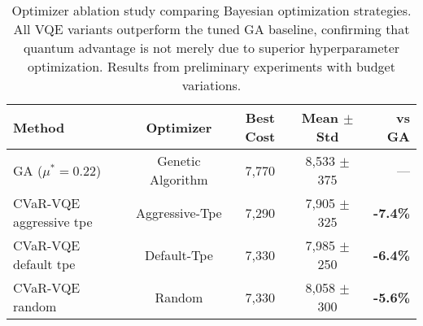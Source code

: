 \begin{table}[htb]
    \centering
    \caption{Optimizer ablation study comparing Bayesian optimization strategies. All VQE variants outperform the tuned GA baseline, confirming that quantum advantage is not merely due to superior hyperparameter optimization. Results from preliminary experiments with budget variations.}
    \label{tab:optimizer_ablation}
    \begin{tabular}{lcccr}
        \toprule
        Method & Optimizer & Best Cost & Mean $\pm$ Std & vs GA \\
        \midrule
        GA ($\mu^* = 0.22$) & Genetic Algorithm & 7,770 & 8,533 $\pm$ 375 & — \\
        CVaR-VQE aggressive tpe & Aggressive-Tpe & 7,290 & 7,905 $\pm$ 325 & \textbf{-7.4\%} \\
        CVaR-VQE default tpe & Default-Tpe & 7,330 & 7,985 $\pm$ 250 & \textbf{-6.4\%} \\
        CVaR-VQE random & Random & 7,330 & 8,058 $\pm$ 300 & \textbf{-5.6\%} \\
        \bottomrule
    \end{tabular}
\end{table}